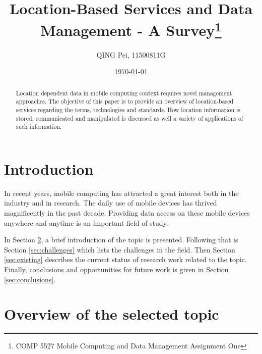 \documentclass[12pt,a4paper]{article}
\begin{document}
\title{Location-Based Services and Data Management - A Survey\footnote{COMP 5527 Mobile Computing and Data Management Assignment One}}
\author{QING Pei, 11500811G}
\date{\today}
% 

\maketitle

\begin{abstract}
Location dependent data in mobile computing context requires novel management approaches. The objective of this paper is to provide an overview of location-based services regarding the terms, technologies and standards. How location information is stored, communicated and manipulated is discussed as well a variety of applications of such information.
\end{abstract}


\section{Introduction} %
\label{sec:intro}
In recent years, mobile computing has attracted a great interest both in the industry and in research. The daily use of mobile devices has thrived magnificently in the past decade. Providing data access on these mobile devices anywhere and anytime is an important field of study.

In Section \ref{sec:overview}, a brief introduction of the topic is presented. Following that is Section \ref{sec:challenges} which lists the challenges in the field. Then Section \ref{sec:existing} describes the current status of research work related to the topic. Finally, conclusions and opportunities for future work is given in Section \ref{sec:conclusions}.

\section{Overview of the selected topic} %
\label{sec:overview}
\end{document}
